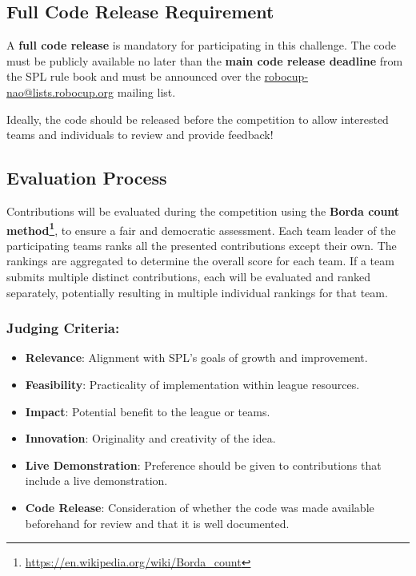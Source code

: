 \subsection{Full Code Release Requirement}
A \textbf{full code release} is mandatory for participating in this challenge. The code must be publicly available no later than the \textbf{main code release deadline} from the SPL rule book and must be announced over the \url{robocup-nao@lists.robocup.org} mailing list.

Ideally, the code should be released before the competition to allow interested teams and individuals to review and provide feedback!

\subsection{Evaluation Process}
Contributions will be evaluated during the competition using the \textbf{Borda count method\footnote{\url{https://en.wikipedia.org/wiki/Borda_count}}}, to ensure a fair and democratic assessment. Each team leader of the participating teams ranks all the presented contributions except their own. The rankings are aggregated to determine the overall score for each team.
If a team submits multiple distinct contributions, each will be evaluated and ranked separately, potentially resulting in multiple individual rankings for that team.

\subsubsection*{Judging Criteria:}
\begin{itemize}
    \item \textbf{Relevance}: Alignment with SPL’s goals of growth and improvement.
    \item \textbf{Feasibility}: Practicality of implementation within league resources.
    \item \textbf{Impact}: Potential benefit to the league or teams.
    \item \textbf{Innovation}: Originality and creativity of the idea.
    \item \textbf{Live Demonstration}: Preference should be given to contributions that include a live demonstration.
    \item \textbf{Code Release}: Consideration of whether the code was made available beforehand for review and that it is well documented.
\end{itemize}

